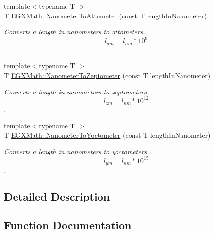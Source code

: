 \begin{DoxyCompactItemize}
{\footnotesize template$<$typename T $>$ }\\T \mbox{\hyperlink{group___e_g_x_math-_conversions-_length_conversions-_s_i-_nanometer-_s_i_ga6bb90e8a7f98c79dc2ebbb8a46535fe0}{E\+G\+X\+Math\+::\+Nanometer\+To\+Attometer}} (const T length\+In\+Nanometer)
\begin{DoxyCompactList}\small\item\em Converts a length in nanometers to attometers. \[ l_{am}=l_{nm} * 10^{9} \]. \end{DoxyCompactList}\item 
{\footnotesize template$<$typename T $>$ }\\T \mbox{\hyperlink{group___e_g_x_math-_conversions-_length_conversions-_s_i-_nanometer-_s_i_ga3104d856008f94fc14378e95cfbe771f}{E\+G\+X\+Math\+::\+Nanometer\+To\+Zeptometer}} (const T length\+In\+Nanometer)
\begin{DoxyCompactList}\small\item\em Converts a length in nanometers to zeptometers. \[ l_{zm}=l_{nm} * 10^{12} \]. \end{DoxyCompactList}\item 
{\footnotesize template$<$typename T $>$ }\\T \mbox{\hyperlink{group___e_g_x_math-_conversions-_length_conversions-_s_i-_nanometer-_s_i_gab447c3aa3d215a1030a63e28f9aca1c1}{E\+G\+X\+Math\+::\+Nanometer\+To\+Yoctometer}} (const T length\+In\+Nanometer)
\begin{DoxyCompactList}\small\item\em Converts a length in nanometers to yoctometers. \[ l_{ym}=l_{nm} * 10^{15} \]. \end{DoxyCompactList}\end{DoxyCompactItemize}


\subsection{Detailed Description}


\subsection{Function Documentation}
\mbox{\label{group___e_g_x_math-_conversions-_length_conversions-_s_i-_nanometer-_s_i_ga6bb90e8a7f98c79dc2ebbb8a46535fe0}} 
